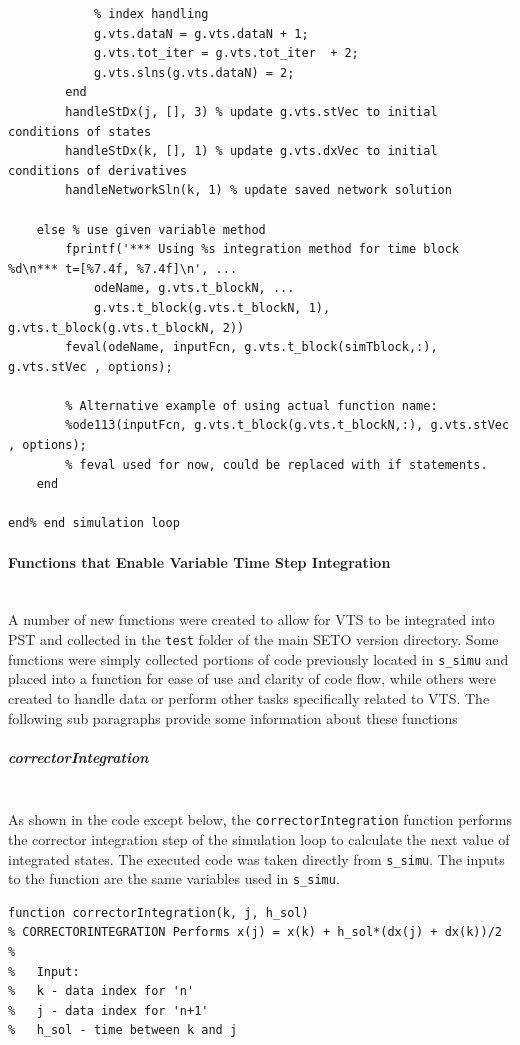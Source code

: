 \documentclass[12pt]{article}
\begin{document}
\begin{verbatim}
            % index handling
            g.vts.dataN = g.vts.dataN + 1;
            g.vts.tot_iter = g.vts.tot_iter  + 2;
            g.vts.slns(g.vts.dataN) = 2;
        end
        handleStDx(j, [], 3) % update g.vts.stVec to initial conditions of states
        handleStDx(k, [], 1) % update g.vts.dxVec to initial conditions of derivatives 
        handleNetworkSln(k, 1) % update saved network solution

    else % use given variable method
        fprintf('*** Using %s integration method for time block %d\n*** t=[%7.4f, %7.4f]\n', ...
            odeName, g.vts.t_blockN, ...
            g.vts.t_block(g.vts.t_blockN, 1), g.vts.t_block(g.vts.t_blockN, 2))
        feval(odeName, inputFcn, g.vts.t_block(simTblock,:), g.vts.stVec , options);
        
        % Alternative example of using actual function name:
        %ode113(inputFcn, g.vts.t_block(g.vts.t_blockN,:), g.vts.stVec , options);
        % feval used for now, could be replaced with if statements.
    end
    
end% end simulation loop
\end{verbatim}

\pagebreak
\paragraph{Functions that Enable Variable Time Step Integration} \ \\
A number of new functions were created to allow for VTS to be integrated into PST and collected in the \verb|test| folder of the main SETO version directory.
Some functions were simply collected portions of code previously located in \verb|s_simu| and placed into a function for ease of use and clarity of code flow, while others were created to handle data or perform other tasks specifically related to VTS.
The following sub paragraphs provide some information about these functions 

\subparagraph{correctorIntegration} \ \\
As shown in the code except below, the \verb|correctorIntegration| function performs the corrector integration step of the simulation loop to calculate the next value of integrated states.
The executed code was taken directly from \verb|s_simu|.
The inputs to the function are the same variables used in  \verb|s_simu|.

\begin{verbatim}
function correctorIntegration(k, j, h_sol)
% CORRECTORINTEGRATION Performs x(j) = x(k) + h_sol*(dx(j) + dx(k))/2
%
%   Input:
%   k - data index for 'n'
%   j - data index for 'n+1'
%   h_sol - time between k and j
\end{verbatim}
\end{document}
